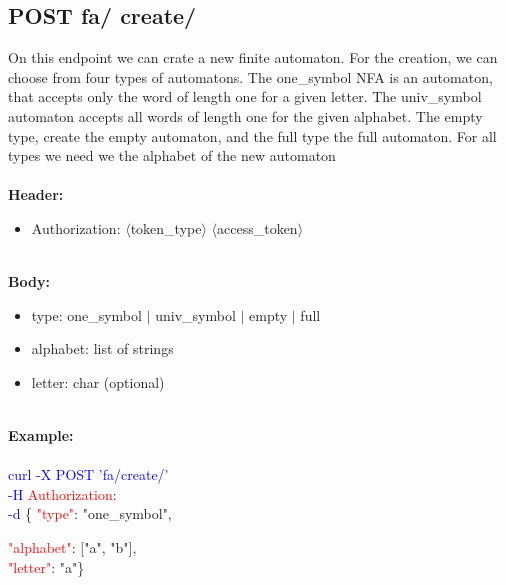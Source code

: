 \subsection{POST fa/ create/}
On this endpoint we can crate a new finite automaton. For the creation, we can choose from four types of automatons. The one\_symbol NFA is an automaton, that accepts only the word of length one for a given letter. The univ\_symbol automaton accepts all words of length one for the given alphabet. The empty type, create the empty automaton, and the full type the full automaton. For all types we need we the alphabet of the new automaton \\
\ \\
\textbf{Header:}
\begin{itemize}
    \item Authorization: $\langle$token\_type$\rangle$ $\langle$access\_token$\rangle$
\end{itemize}
\ \\
\textbf{Body:}
\begin{itemize}
    \item type: one\_symbol $|$ univ\_symbol $|$ empty $|$ full
    \item alphabet: list of strings
    \item letter: char (optional)
\end{itemize}
\ \\
\textbf{Example:} \\
\ \\
\textcolor{blue}{curl -X POST '\BaseURL fa/create/'\\
-H} \textcolor{red}{Authorization}: \Auth \\
\textcolor{blue}{-d} \{ 
     \textcolor{red}{"type"}: "one\_symbol",
     \begin{adjustwidth}{7.5 mm}{0 cm}
        \textcolor{red}{"alphabet"}: ["a", "b"],\\
        \textcolor{red}{"letter"}: "a"\}
     \end{adjustwidth}
     
